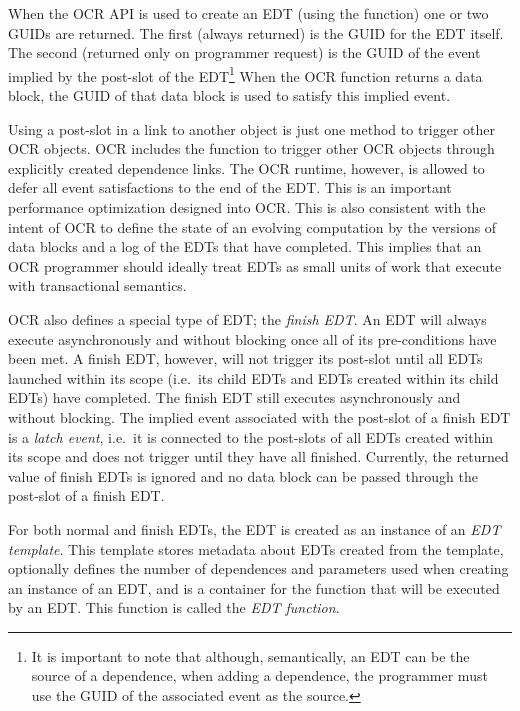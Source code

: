 When the OCR API is used to create an EDT (using the  function)
one or two GUIDs are returned. The first (always returned) is the GUID
for the EDT itself. The second (returned only on programmer request)
is the GUID of the event implied by the post-slot of the EDT\footnote{It is important to
note that although, semantically, an EDT can be the source of a
dependence, when adding a dependence, the programmer must use the
GUID of the associated event as the source.}
When the OCR function returns a data block, the GUID of
that data block is used to satisfy this implied event.

Using a post-slot in a link to another object is just one method to
trigger other OCR objects. OCR includes the 
function to trigger other OCR objects through explicitly created dependence
links. The OCR runtime, however, is allowed to defer all event satisfactions
to the end of the EDT. This is an important performance optimization designed
into OCR. This is also consistent with the intent of OCR to define the state
of an evolving computation by the versions of data blocks and a log of the
EDTs that have completed. This implies that an OCR programmer should
ideally treat EDTs as small units of work that execute with transactional
semantics.

OCR also defines a special type of EDT; the \emph{finish
EDT}. An EDT will always execute asynchronously and
without blocking once all of its pre-conditions have been met. A
finish EDT, however, will not trigger its post-slot until all EDTs
launched within its scope (i.e.\ its child EDTs and EDTs created
within its child EDTs) have completed. The finish EDT still executes
asynchronously and without blocking. The implied event associated with
the post-slot of a finish EDT is a \emph{latch event}, i.e.\ it is
connected to the post-slots of all EDTs created within its scope and
does not trigger until they have all finished. Currently, the returned
value of finish EDTs is ignored and no data block can be passed
through the post-slot of a finish EDT.

For both normal and finish EDTs, the EDT is created as an
instance of an \emph{EDT template}. This template stores metadata about EDTs created from the
template, optionally defines the number of dependences and parameters
used when creating an instance of an EDT, and is a container for the
function that will be executed by an EDT. This function is called the
\emph{EDT function}.

